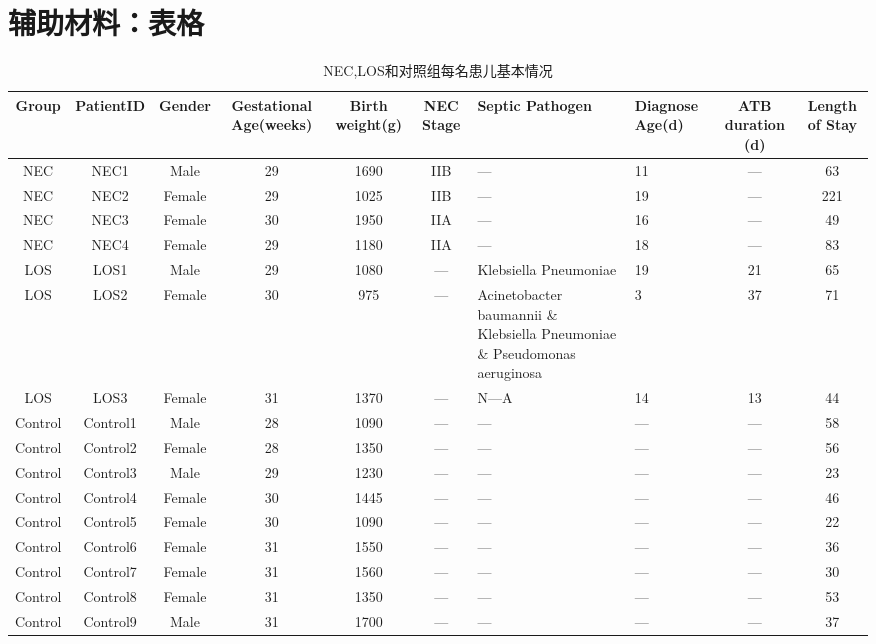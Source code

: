 \chapter{辅助材料：表格}
\label{app:table}
\begin{sidewaystable}[h]
  \tiny
\caption{NEC,LOS和对照组每名患儿基本情况} %
\centering %
\begin{tabular}{ccccccp{2cm}p{2cm}cc} %
\hline\hline %
Group & PatientID & Gender& Gestational Age(weeks) & Birth weight(g) & NEC Stage & Septic Pathogen & Diagnose Age(d) & ATB duration (d) & Length of Stay \\ [0.05ex]
\hline %
NEC & NEC1 & Male & 29 & 1690 & IIB & — & 11 & — & 63 \\
NEC & NEC2 & Female & 29 & 1025 & IIB & — & 19 & — & 221 \\
NEC & NEC3 & Female & 30 & 1950 & IIA & — & 16 & — & 49 \\
NEC & NEC4 & Female & 29 & 1180 & IIA & — & 18 & — & 83 \\
LOS & LOS1 & Male & 29 & 1080 & — & Klebsiella Pneumoniae & 19 & 21 & 65 \\
LOS & LOS2 & Female & 30 & 975 & — & Acinetobacter baumannii \&  Klebsiella Pneumoniae \&  Pseudomonas aeruginosa & 3 & 37 & 71 \\
LOS & LOS3 & Female & 31 & 1370 & — & N—A & 14 & 13 & 44 \\
Control & Control1 & Male & 28 & 1090 & — & — & — & — & 58 \\
Control & Control2 & Female & 28 & 1350 & — & — & — & — & 56 \\
Control & Control3 & Male & 29 & 1230 & — & — & — & — & 23 \\
Control & Control4 & Female & 30 & 1445 & — & — & — & — & 46 \\
Control & Control5 & Female & 30 & 1090 & — & — & — & — & 22  \\
Control & Control6 & Female & 31 & 1550 & — & — & — & — & 36 \\
Control & Control7 & Female & 31 & 1560 & — & — & — & — & 30 \\
Control & Control8 & Female & 31 & 1350 & — & — & — & — & 53 \\
Control & Control9 & Male & 31 & 1700 & — & — & — & — & 37 \\

\end{tabular}
\end{sidewaystable}
